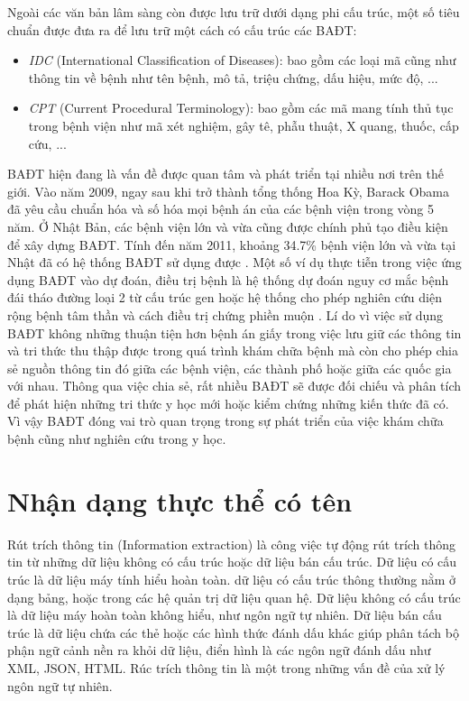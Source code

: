 Ngoài các văn bản lâm sàng còn được lưu trữ dưới dạng phi cấu trúc, một số tiêu chuẩn được đưa ra để lưu trữ một cách có cấu trúc các BAĐT:

\begin{itemize}[noitemsep]
\item \emph{IDC} (International Classification of Diseases): bao gồm các loại mã cũng như thông tin về bệnh như tên bệnh, mô tả, triệu chứng, dấu hiệu, mức độ, ...
\item \textit{CPT} (Current Procedural Terminology): bao gồm các mã mang tính thủ tục trong bệnh viện như mã xét nghiệm, gây tê, phẫu thuật, X quang, thuốc, cấp cứu, ...
\end{itemize}

BAĐT hiện đang là vấn đề được quan tâm và phát triển tại nhiều nơi trên thế giới. Vào năm 2009, ngay sau khi trở thành tổng thống Hoa Kỳ, Barack Obama đã yêu cầu chuẩn hóa và số hóa mọi bệnh án của các bệnh viện trong vòng 5 năm. Ở Nhật Bản, các bệnh viện lớn và vừa cũng được chính phủ tạo điều kiện để xây dựng BAĐT. Tính đến năm 2011, khoảng 34.7\% bệnh viện lớn và vừa tại Nhật đã có hệ thống BAĐT sử dụng được \cite{HoTuBao2015}. Một số ví dụ thực tiễn trong việc ứng dụng BAĐT vào dự đoán, điều trị bệnh là hệ thống dự đoán nguy cơ mắc bệnh đái tháo đường loại 2 từ cấu trúc gen \cite{AbelKho2012} hoặc hệ thống cho phép nghiên cứu diện rộng bệnh tâm thần và cách điều trị chứng phiền muộn \cite{Perlis2012}. Lí do vì việc sử dụng BAĐT không những thuận tiện hơn bệnh án giấy trong việc lưu giữ các thông tin và tri thức thu thập được trong quá trình khám chữa bệnh mà còn cho phép chia sẻ nguồn thông tin đó giữa các bệnh viện, các thành phố hoặc giữa các quốc gia với nhau. Thông qua việc chia sẻ, rất nhiều BAĐT sẽ được đối chiếu và phân tích để phát hiện những tri thức y học mới hoặc kiểm chứng những kiến thức đã có. Vì vậy BAĐT đóng vai trò quan trọng trong sự phát triển của việc khám chữa bệnh cũng như nghiên cứu trong y học.

\section{Nhận dạng thực thể có tên}
Rút trích thông tin (Information extraction) là công việc tự động rút trích thông tin từ những dữ liệu không có cấu trúc hoặc dữ liệu bán cấu trúc. Dữ liệu có cấu trúc là dữ liệu máy tính hiểu hoàn toàn. dữ liệu có cấu trúc thông thường nằm ở dạng bảng, hoặc trong các hệ quản trị dữ liệu quan hệ. Dữ liệu không có cấu trúc là dữ liệu máy hoàn toàn không hiểu, như ngôn ngữ tự nhiên. Dữ liệu bán cấu trúc là dữ liệu chứa các thẻ hoặc các hình thức đánh dấu khác giúp phân tách bộ phận ngữ cảnh nền ra khỏi dữ liệu, điển hình là các ngôn ngữ đánh dấu như XML, JSON, HTML. Rúc trích thông tin là một trong những vấn đề của xử lý ngôn ngữ tự nhiên.

